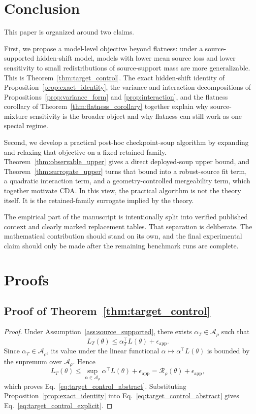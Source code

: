 \documentclass{article}
\theoremstyle{definition}
\newcommand{\cA}{\mathcal{A}}
\newcommand{\cda}{\textup{\textsc{CDA}}}
\begin{document}
\section{Conclusion}

This paper is organized around two claims.

First, we propose a model-level objective beyond flatness: under a source-supported hidden-shift model, models with lower mean source loss and lower sensitivity to small redistributions of source-support mass are more generalizable. This is Theorem~\ref{thm:target_control}. The exact hidden-shift identity of Proposition~\ref{prop:exact_identity}, the variance and interaction decompositions of Propositions~\ref{prop:variance_form} and \ref{prop:interaction}, and the flatness corollary of Theorem~\ref{thm:flatness_corollary} together explain why source-mixture sensitivity is the broader object and why flatness can still work as one special regime.

Second, we develop a practical post-hoc checkpoint-soup algorithm by expanding and relaxing that objective on a fixed retained family. Theorem~\ref{thm:observable_upper} gives a direct deployed-soup upper bound, and Theorem~\ref{thm:surrogate_upper} turns that bound into a robust-source fit term, a quadratic interaction term, and a geometry-controlled mergeability term, which together motivate \cda{}. In this view, the practical algorithm is not the theory itself. It is the retained-family surrogate implied by the theory.

The empirical part of the manuscript is intentionally split into verified published context and clearly marked replacement tables. That separation is deliberate. The mathematical contribution should stand on its own, and the final experimental claim should only be made after the remaining benchmark runs are complete.

\appendix

\section{Proofs}

\subsection{Proof of Theorem~\ref{thm:target_control}}

\begin{proof}
Under Assumption~\ref{ass:source_supported}, there exists \(\alpha_T\in \cA_\rho\) such that
\[
L_T(\theta)\le \alpha_T^\top L(\theta)+\epsilon_{\mathrm{app}}.
\]
Since \(\alpha_T\in \cA_\rho\), its value under the linear functional \(\alpha\mapsto \alpha^\top L(\theta)\) is bounded by the supremum over \(\cA_\rho\). Hence
\[
L_T(\theta)
\le
\sup_{\alpha\in\cA_\rho}\alpha^\top L(\theta)+\epsilon_{\mathrm{app}}
=
\mathcal R_\rho(\theta)+\epsilon_{\mathrm{app}},
\]
which proves Eq.~\eqref{eq:target_control_abstract}. Substituting Proposition~\ref{prop:exact_identity} into Eq.~\eqref{eq:target_control_abstract} gives Eq.~\eqref{eq:target_control_explicit}.
\end{proof}
\end{document}
